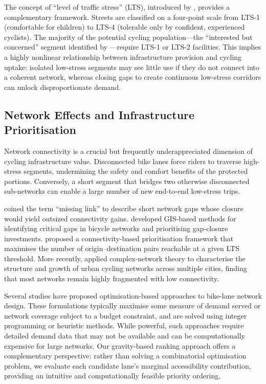 \documentclass[12pt,a4paper]{article}
\begin{document}
The concept of ``level of traffic stress'' (LTS), introduced by \citet{mekuria2012low}, provides a complementary framework. Streets are classified on a four-point scale from LTS-1 (comfortable for children) to LTS-4 (tolerable only by confident, experienced cyclists). The majority of the potential cycling population---the ``interested but concerned'' segment identified by \citet{dill2003bicycle}---require LTS-1 or LTS-2 facilities. This implies a highly nonlinear relationship between infrastructure provision and cycling uptake: isolated low-stress segments may see little use if they do not connect into a coherent network, whereas closing gaps to create continuous low-stress corridors can unlock disproportionate demand.

\subsection{Network Effects and Infrastructure Prioritisation}

Network connectivity is a crucial but frequently underappreciated dimension of cycling infrastructure value. Disconnected bike lanes force riders to traverse high-stress segments, undermining the safety and comfort benefits of the protected portions. Conversely, a short segment that bridges two otherwise disconnected sub-networks can enable a large number of new end-to-end low-stress trips.

\citet{schoner2014missing} coined the term ``missing link'' to describe short network gaps whose closure would yield outsized connectivity gains. \citet{lowry2016using} developed GIS-based methods for identifying critical gaps in bicycle networks and prioritising gap-closure investments. \citet{furth2016network} proposed a connectivity-based prioritisation framework that maximises the number of origin--destination pairs reachable at a given LTS threshold. More recently, \citet{natera2020data} applied complex-network theory to characterise the structure and growth of urban cycling networks across multiple cities, finding that most networks remain highly fragmented with low connectivity.

Several studies have proposed optimisation-based approaches to bike-lane network design. These formulations typically maximise some measure of demand served or network coverage subject to a budget constraint, and are solved using integer programming or heuristic methods. While powerful, such approaches require detailed demand data that may not be available and can be computationally expensive for large networks. Our gravity-based ranking approach offers a complementary perspective: rather than solving a combinatorial optimisation problem, we evaluate each candidate lane's marginal accessibility contribution, providing an intuitive and computationally feasible priority ordering.
\end{document}
